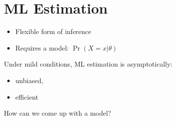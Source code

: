 \documentclass[landscape]{foils}
\begin{document}
\myNewSlide
\section*{ML Estimation}
\large
\begin{itemize}
	\item Flexible form of inference
	\item Requires a model: $\Pr(X=x|\theta)$
\end{itemize}
Under mild conditions, ML estimation is asymptotically:
\begin{itemize}
	\item unbiased,
	\item efficient
\end{itemize}
How can we come up with a model?
\end{document}
